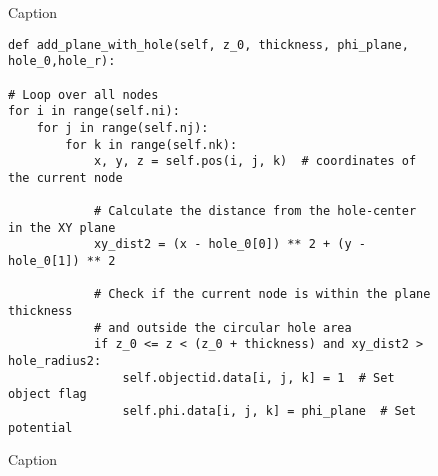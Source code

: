 \begin{figure}
    \centering
    
    \caption{Caption}
    \label{fig:enter-label}
\end{figure}



\begin{figure} [H]
    \centering
    \begin{lstlisting}
def add_plane_with_hole(self, z_0, thickness, phi_plane, hole_0,hole_r):

# Loop over all nodes
for i in range(self.ni):
    for j in range(self.nj):
        for k in range(self.nk):
            x, y, z = self.pos(i, j, k)  # coordinates of the current node
            
            # Calculate the distance from the hole-center in the XY plane
            xy_dist2 = (x - hole_0[0]) ** 2 + (y - hole_0[1]) ** 2
            
            # Check if the current node is within the plane thickness
            # and outside the circular hole area
            if z_0 <= z < (z_0 + thickness) and xy_dist2 > hole_radius2:
                self.objectid.data[i, j, k] = 1  # Set object flag
                self.phi.data[i, j, k] = phi_plane  # Set potential
    \end{lstlisting}
    \caption{Caption}
    \label{fig:enter-label}
\end{figure}
